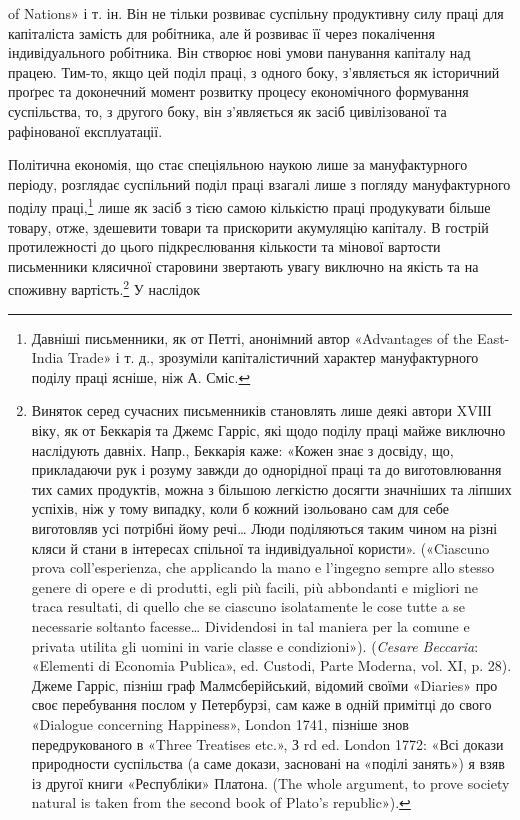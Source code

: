 \parcont{}  %
of Nations» і т. ін. Він не тільки розвиває суспільну продуктивну
силу праці для капіталіста замість для робітника, але й розвиває
її через покалічення індивідуального робітника. Він створює
нові умови панування капіталу над працею. Тим-то, якщо цей
поділ праці, з одного боку, з’являється як історичний проґрес
та доконечний момент розвитку процесу економічного формування
суспільства, то, з другого боку, він з’являється як засіб
цивілізованої та рафінованої експлуатації.

Політична економія, що стає спеціяльною наукою лише за
мануфактурного періоду, розглядає суспільний поділ праці взагалі
лише з погляду мануфактурного поділу праці,\footnote{
Давніші письменники, як от Петті, анонімний автор «Advantages
of the East-India Trade» і т. д., зрозуміли капіталістичний характер
мануфактурного поділу праці ясніше, ніж А. Сміс.
} лише як
засіб з тією самою кількістю праці продукувати більше товару,
отже, здешевити товари та прискорити акумуляцію капіталу.
В гострій протилежності до цього підкреслювання кількости та
мінової вартости письменники клясичної старовини звертають
увагу виключно на якість та на споживну вартість.\footnote{
Виняток серед сучасних письменників становлять лише деякі
автори XVІІІ віку, як от Беккарія та Джемс Гарріс, які щодо поділу
праці майже виключно наслідують давніх. Напр., Беккарія каже: «Кожен
знає з досвіду, що, прикладаючи рук і розуму завжди до однорідної праці
та до виготовлювання тих самих продуктів, можна з більшою легкістю
досягти значніших та ліпших успіхів, ніж у тому випадку, коли б кожний
ізольовано сам для себе виготовляв усі потрібні йому речі\dots{} Люди поділяються
таким чином на різні кляси й стани в інтересах спільної та індивідуальної
користи». («Ciascuno prova coll’esperienza, che applicando
la mano e l’ingegno sempre allo stesso genere di opere e di produtti, egli
più facili, più abbondanti e migliori ne traca resultati, di quello che se
ciascuno isolatamente le cose tutte a se necessarie soltanto facesse\dots{} Dividendosi
in tal maniera per la comune e privata utilita gli uomini
in varie classe e condizioni»). (\emph{Cesare Beccaria}: «Elementi di Economia
Publica», ed. Custodi, Parte Moderna, vol. XI, p. 28). Джеме
Гарріс, пізніш граф Малмсберійський, відомий своїми «Diaries» про
своє перебування послом у Петербурзі, сам каже в одній примітці до
свого «Dialogue concerning Happiness», London 1741, пізніше знов передрукованого
в «Three Treatises etc.», З rd ed. London 1772: «Всі докази
природности суспільства (а саме докази, засновані на «поділі занять»)
я взяв із другої книги «Республіки» Платона. (The whole argument,
to prove society natural is taken from the second book of Plato’s
republic»).
} У наслідок
